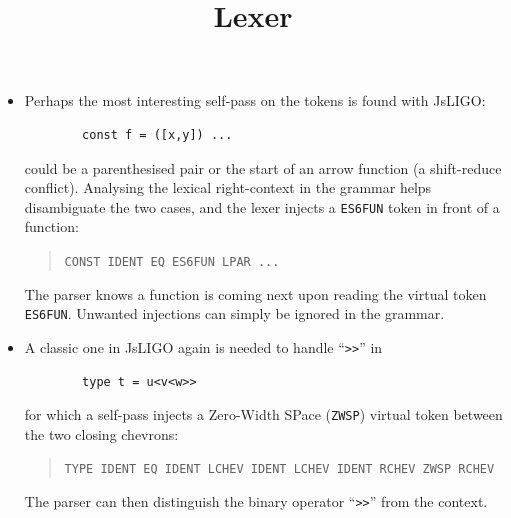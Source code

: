 \documentclass[wide]{slides}
\newcommand{\JsLIGO}[0]{\textsf{JsLIGO}}
\begin{document}
\begin{slide}
  \lstset{language=JavaScript}

  \title{Lexer}

  \begin{itemize}

    \item Perhaps the most interesting self\hyp{}pass on the tokens is
      found with \JsLIGO{}:
      \begin{lstlisting}
        const f = ([x,y]) ...
      \end{lstlisting}
      could be a parenthesised pair or the start of an arrow function
      (a shift\hyp{}reduce conflict). Analysing the lexical
      right\hyp{}context in the grammar helps disambiguate the two
      cases, and the lexer injects a \verb+ES6FUN+ token in front of a
      function:
      \begin{quote}
      \verb|CONST IDENT EQ ES6FUN LPAR ...|
      \end{quote}
      The parser knows a function is coming next upon reading the
      virtual token \verb+ES6FUN+. Unwanted injections can simply be
      ignored in the grammar.

    \item A classic one in \JsLIGO{} again is needed to handle
      ``\verb+>>+'' in
      \begin{lstlisting}
        type t = u<v<w>>
      \end{lstlisting}
      for which a self\hyp{}pass injects a Zero\hyp{}Width SPace
      (\verb|ZWSP|) virtual token between the two closing chevrons:
      \begin{quote}
       \verb|TYPE IDENT EQ IDENT LCHEV IDENT LCHEV IDENT RCHEV ZWSP RCHEV|
      \end{quote}
      The parser can then distinguish the binary operator
      ``\verb+>>+'' from the context.

  \end{itemize}
\end{slide}
\end{document}
